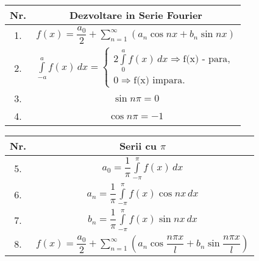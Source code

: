 \documentclass{article}
\begin{document}
\setlength{\extrarowheight}{10pt}


\noindent
\hspace*{-3cm} %
\begin{minipage}{\dimexpr\textwidth+2cm}
  \begin{tabular}{|c|c|}
    \hline
    \textbf{Nr.} & \textbf{Dezvoltare in Serie Fourier}                                                                         \\
    \hline
    1.           & $ f(x) = \dfrac{a_0}{2} +\displaystyle\sum\limits_{n = 1}^{\infty} \left(a_n \cos nx + b_n \sin nx\right)  $ \\
    \hline
    2.           & $ \displaystyle\int\limits_{-a}^{a} f(x) \,dx =
      \begin{cases}
        2\displaystyle\int\limits_{0}^{a} f(x) \,dx \Rightarrow \text{f(x) - para}, \\
        0 \Rightarrow \text{f(x)  impara}.
      \end{cases}
    $                                                                                                                           \\
    \hline
    3.           & $ \sin n\pi = 0 $                                                                                            \\
    \hline
    4.           & $ \cos n\pi = -1 $                                                                                           \\
    \hline
  \end{tabular}
  \hspace{1cm} %
  \begin{tabular}{|c|c|}
    \hline
    \textbf{Nr.} & \textbf{Serii cu $\pi$}                                                                                                                    \\
    \hline
    5.           & $ a_0 = \dfrac{1}{\pi} \displaystyle\int\limits_{-\pi}^{\pi} f(x) \,dx $                                                                   \\
    \hline
    6.           & $ a_n = \dfrac{1}{\pi} \displaystyle\int\limits_{-\pi}^{\pi} f(x) \cos nx \,dx $                                                           \\
    \hline
    7.           & $ b_n = \dfrac{1}{\pi} \displaystyle\int\limits_{-\pi}^{\pi} f(x) \sin nx \,dx $                                                           \\
    \hline
    8.           & $ f(x) = \dfrac{a_0}{2} + \displaystyle\sum\limits_{n = 1}^{\infty} \left(a_n \cos \dfrac{n\pi x}{l} + b_n \sin \dfrac{n\pi x}{l}\right) $ \\
    \hline
  \end{tabular}


\end{minipage}
\end{document}
